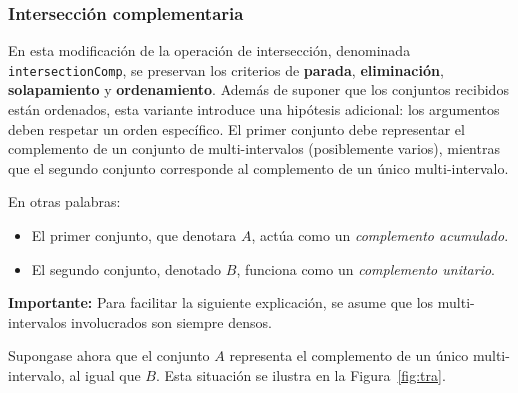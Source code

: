 \subsubsection{Intersección complementaria}

En esta modificación de la operación de intersección, denominada \texttt{intersectionComp}, se preservan los criterios de \textbf{parada}, \textbf{eliminación}, \textbf{solapamiento} y \textbf{ordenamiento}. Además de suponer que los conjuntos recibidos están ordenados, esta variante introduce una hipótesis adicional: los argumentos deben respetar un orden específico. El primer conjunto debe representar el complemento de un conjunto de multi-intervalos (posiblemente varios), mientras que el segundo conjunto corresponde al complemento de un único multi-intervalo. 

En otras palabras:
\begin{itemize}
    \item El primer conjunto, que denotara $A$, actúa como un \emph{complemento acumulado}.
    \item El segundo conjunto, denotado $B$, funciona como un \emph{complemento unitario}.
\end{itemize}

\textbf{Importante:} Para facilitar la siguiente explicación, se asume que los multi-intervalos involucrados son siempre densos.

Supongase ahora que el conjunto $A$ representa el complemento de un único multi-intervalo, al igual que $B$. Esta situación se ilustra en la Figura~\ref{fig:tra}.

